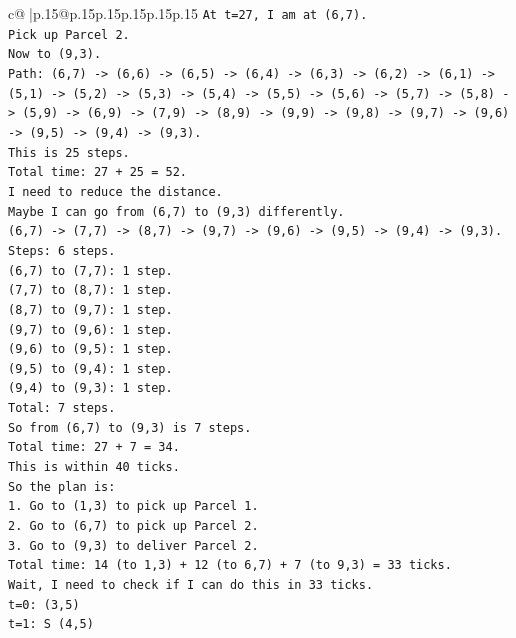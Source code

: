 \documentclass{article}
\begin{document}
{\begin{supertabular}{c@{$\;$}|p{.15\linewidth}@{}p{.15\linewidth}p{.15\linewidth}p{.15\linewidth}p{.15\linewidth}p{.15\linewidth}}
{{{\texttt{At t=27, I am at (6,7).} \\
\texttt{Pick up Parcel 2.} \\
\texttt{Now to (9,3).} \\
\texttt{Path: (6,7) {-}> (6,6) {-}> (6,5) {-}> (6,4) {-}> (6,3) {-}> (6,2) {-}> (6,1) {-}> (5,1) {-}> (5,2) {-}> (5,3) {-}> (5,4) {-}> (5,5) {-}> (5,6) {-}> (5,7) {-}> (5,8) {-}> (5,9) {-}> (6,9) {-}> (7,9) {-}> (8,9) {-}> (9,9) {-}> (9,8) {-}> (9,7) {-}> (9,6) {-}> (9,5) {-}> (9,4) {-}> (9,3).} \\
\texttt{This is 25 steps.} \\
\texttt{Total time: 27 + 25 = 52.} \\
\texttt{I need to reduce the distance.} \\
\texttt{Maybe I can go from (6,7) to (9,3) differently.} \\
\texttt{(6,7) {-}> (7,7) {-}> (8,7) {-}> (9,7) {-}> (9,6) {-}> (9,5) {-}> (9,4) {-}> (9,3).} \\
\texttt{Steps: 6 steps.} \\
\texttt{(6,7) to (7,7): 1 step.} \\
\texttt{(7,7) to (8,7): 1 step.} \\
\texttt{(8,7) to (9,7): 1 step.} \\
\texttt{(9,7) to (9,6): 1 step.} \\
\texttt{(9,6) to (9,5): 1 step.} \\
\texttt{(9,5) to (9,4): 1 step.} \\
\texttt{(9,4) to (9,3): 1 step.} \\
\texttt{Total: 7 steps.} \\
\texttt{So from (6,7) to (9,3) is 7 steps.} \\
\texttt{Total time: 27 + 7 = 34.} \\
\texttt{This is within 40 ticks.} \\
\texttt{So the plan is:} \\
\texttt{1. Go to (1,3) to pick up Parcel 1.} \\
\texttt{2. Go to (6,7) to pick up Parcel 2.} \\
\texttt{3. Go to (9,3) to deliver Parcel 2.} \\
\texttt{Total time: 14 (to 1,3) + 12 (to 6,7) + 7 (to 9,3) = 33 ticks.} \\
\texttt{Wait, I need to check if I can do this in 33 ticks.} \\
\texttt{t=0: (3,5)} \\
\texttt{t=1: S (4,5)} \\
}}}
\end{supertabular}}
\end{document}
